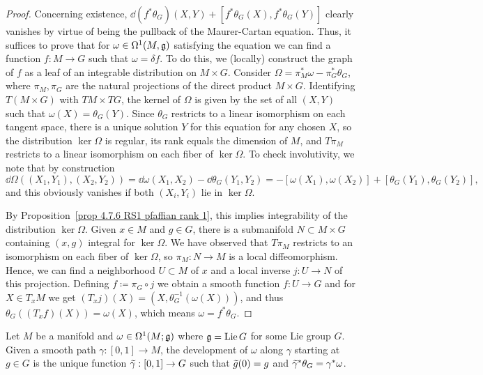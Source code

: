 \begin{proof}
    Concerning existence, $\dd(f^\ast\theta_G)(X,Y)+[f^\ast\theta_G(X),f^\ast\theta_G(Y)]$ clearly vanishes by virtue of being the pullback of the Maurer-Cartan equation. Thus, it suffices to prove that for $\omega\in\Omega^1(M,\mathfrak{g})$ satisfying the equation we can find a function $f:M\to G$ such that $\omega=\delta f$. To do this, we (locally) construct the graph of $f$ as a leaf of an integrable distribution on $M\times G$. Consider $\Omega=\pi^\ast_M\omega-\pi^\ast_G \theta_G$, where $\pi_M,\pi_G$ are the natural projections of the direct product $M\times G$. Identifying $T(M\times G)$ with $TM\times TG$, the kernel of $\Omega$ is given by the set of all $(X,Y)$ such that $\omega(X)=\theta_G(Y)$. Since $\theta_G$ restricts to a linear isomorphism on each tangent space, there is a unique solution $Y$ for this equation for any chosen $X$, so the distribution $\ker\Omega$ is regular, its rank equals the dimension of $M$, and $T\pi_M$ restricts to a linear isomorphism on each fiber of $\ker \Omega$. To check involutivity, we note that by construction
    \[\dd\Omega\left((X_1,Y_1),(X_2,Y_2)\right)=\dd\omega(X_1,X_2)-\dd \theta_G(Y_1,Y_2)=-[\omega(X_1),\omega(X_2)]+[\theta_G(Y_1),\theta_G(Y_2)],\]
    and this obviously vanishes if both $(X_i,Y_i)$ lie in $\ker\Omega$.

    By Proposition~\ref{prop 4.7.6 RS1 pfaffian rank 1}, this implies integrability of the distribution $\ker\Omega$. Given $x\in M$ and $g\in G$, there is a submanifold $N\subset M\times G$ containing $(x,g)$ integral for $\ker\Omega$. We have observed that $T\pi_M$ restricts to an isomorphism on each fiber of $\ker \Omega$, so $\pi_M:N\to M$ is a local diffeomorphism. Hence, we can find a neighborhood $U\subset M$ of $x$ and a local inverse $j:U\to N$ of this projection. Defining $f\coloneqq \pi_G\circ j$ we obtain a smooth function $f:U\to G$ and for $X\in T_xM$ we get $(T_x j)(X)=(X,\theta_G^{-1}(\omega(X)))$, and thus $\theta_G((T_xf)(X))=\omega(X)$, which means $\omega=f^\ast\theta_G$.
\end{proof}

\begin{defn}
    Let $M$ be a manifold and $\omega\in\Omega^1(M;\mathfrak{g})$ where $\mathfrak{g}=\operatorname{Lie} G$ for some Lie group $G$. Given a smooth path $\gamma:[0,1]\to M$, the development of $\omega$ along $\gamma$ starting at $g\in G$ is the unique function $\wt{\gamma}:[0,1]\to G$ such that $\wt{g}(0)=g$ and $\wt{\gamma}^\ast\theta_G=\gamma^\ast\omega$.
\end{defn}


